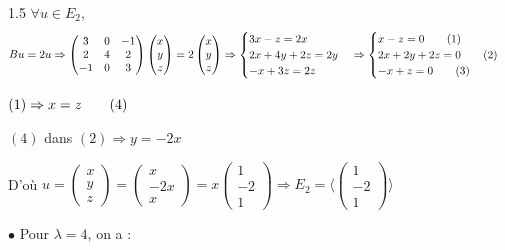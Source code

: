 \documentclass[12pt]{article}
\begin{document}
\begin{spacing}{1.5}
$\forall u\in E_2$, \[Bu=2u\Rightarrow \begin{pmatrix}
3 & 0 & -1 \\ 
2 & 4 & 2 \\ 
-1 & 0 & 3
\end{pmatrix}\begin{pmatrix}
x\\
y\\
z
\end{pmatrix}=2\begin{pmatrix}
x\\
y\\
z
\end{pmatrix}\Rightarrow \begin{cases}
3x-z=2x\\
2x+4y+2z=2y\\
-x+3z=2z
\end{cases}\Rightarrow \begin{cases}
x-z=0 \hspace{0.7cm}(1)\\
2x+2y+2z=0 \hspace{0.7cm}(2)\\
-x+z=0 \hspace{0.7cm} (3)
\end{cases}\]

$(1)\Rightarrow x=z \hspace{0.7cm} (4)$

$(4)$ dans $(2)\Rightarrow y=-2x$

D'où $u=\begin{pmatrix}
x\\
y\\
z
\end{pmatrix}=\begin{pmatrix}
x\\
-2x\\
x
\end{pmatrix}=x\begin{pmatrix}
1\\
-2\\
1
\end{pmatrix}\Rightarrow E_2=\langle \begin{pmatrix}
1\\
-2\\
1
\end{pmatrix}\rangle$

\medskip
$\bullet$ Pour $\lambda=4$, on a :


\end{spacing}
\end{document}
